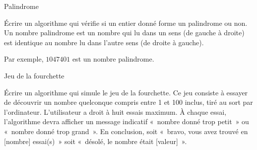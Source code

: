 	\begin{Exercice}{Palindrome}

		Écrire un algorithme qui vérifie si un entier donné 
		forme un palindrome ou non. 
		Un nombre palindrome est un nombre qui lu dans un sens 
		(de gauche à droite) est identique au nombre lu dans l’autre sens 
		(de droite à gauche). 
		
		Par exemple, $1047401$ est un nombre palindrome.
	\end{Exercice}

	\begin{Exercice}{Jeu de la fourchette}

		Écrire un algorithme qui simule le jeu de la
		fourchette. Ce jeu consiste à essayer de découvrir un nombre quelconque
		compris entre 1 et 100 inclus, tiré au sort par l’ordinateur. 
		L’utilisateur a droit à huit essais
		maximum. À chaque essai, l’algorithme devra afficher un message
		indicatif «~nombre donné trop petit~» ou «~nombre donné trop grand~».
		En conclusion, soit «~bravo, vous avez trouvé en [nombre] essai(s)~» soit
		«~désolé, le nombre était [valeur]~».
	\end{Exercice}







